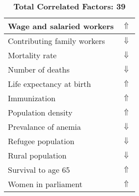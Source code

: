 \documentclass[12pt,notitlepage,oneside]{report}
\begin{document}
\begin{table}[!htb]
\begin{tabular}{|l|l|}
Wage and salaried workers & $\Uparrow$\\ \hline
Contributing family workers & $\Downarrow$\\ \hline
Mortality rate & $\Downarrow$\\ \hline
Number of deaths & $\Downarrow$\\ \hline
Life expectancy at birth & $\Uparrow$\\ \hline
Immunization & $\Uparrow$\\ \hline
Population density & $\Uparrow$\\ \hline
Prevalance of anemia & $\Downarrow$\\ \hline
Refugee population & $\Downarrow$\\ \hline
Rural population & $\Downarrow$\\ \hline
Survival to age 65 & $\Uparrow$\\ \hline
Women in parliament & $\Uparrow$\\ \hline
\end{tabular}
\caption*{\textbf{Total Correlated Factors: 39}}
\end{table}
\clearpage
\end{document}
